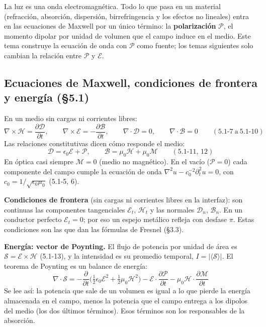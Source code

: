 \documentclass[10pt]{article}
\newcommand{\Ec}{\boldsymbol{\mathcal E}}
\newcommand{\Hc}{\boldsymbol{\mathcal H}}
\newcommand{\Dc}{\boldsymbol{\mathcal D}}
\newcommand{\Bc}{\boldsymbol{\mathcal B}}
\newcommand{\Pc}{\boldsymbol{\mathcal P}}
\newcommand{\Sc}{\boldsymbol{\mathcal S}}
\begin{document}
\begin{idea}
La luz es una onda electromagnética. Todo lo que pasa en un material (refracción, absorción, dispersión, birrefringencia y los efectos no lineales) entra en las ecuaciones de Maxwell por un único término: la \textbf{polarización} $\Pc$, el momento dipolar por unidad de volumen que el campo induce en el medio. Este tema construye la ecuación de onda con $\Pc$ como fuente; los temas siguientes solo cambian la relación entre $\Pc$ y $\Ec$.
\end{idea}

\subsection{Ecuaciones de Maxwell, condiciones de frontera y energía (§5.1)}
En un medio sin cargas ni corrientes libres:
\[
\nabla\times\Hc=\frac{\partial\Dc}{\partial t},\qquad
\nabla\times\Ec=-\frac{\partial\Bc}{\partial t},\qquad
\nabla\cdot\Dc=0,\qquad \nabla\cdot\Bc=0 \qquad(5.1\text{-}7\ \text{a}\ 5.1\text{-}10)
\]
Las relaciones constitutivas dicen cómo responde el medio:
\[
\Dc=\epsilon_0\Ec+\Pc,\qquad \Bc=\mu_0\Hc+\mu_0\boldsymbol{\mathcal M}\qquad(5.1\text{-}11,\,12)
\]
En óptica casi siempre $\boldsymbol{\mathcal M}=0$ (medio no magnético). En el vacío ($\Pc=0$) cada componente del campo cumple la ecuación de onda $\nabla^2u-c_0^{-2}\partial_t^2u=0$, con $c_0=1/\sqrt{\epsilon_0\mu_0}$ (5.1-5, 6).

\textbf{Condiciones de frontera} (sin cargas ni corrientes libres en la interfaz): son continuas las componentes tangenciales $\mathcal E_t$, $\mathcal H_t$ y las normales $\mathcal D_n$, $\mathcal B_n$. En un conductor perfecto $\mathcal E_t=0$; por eso un espejo metálico refleja con desfase $\pi$. Estas condiciones son las que dan las fórmulas de Fresnel (§3.3).

\textbf{Energía: vector de Poynting.} El flujo de potencia por unidad de área es $\Sc=\Ec\times\Hc$ (5.1-13), y la intensidad es su promedio temporal, $I=|\langle\Sc\rangle|$. El teorema de Poynting es un balance de energía:
\[
\nabla\cdot\Sc=-\frac{\partial}{\partial t}\Big(\tfrac12\epsilon_0\mathcal E^2+\tfrac12\mu_0\mathcal H^2\Big)-\Ec\cdot\frac{\partial\Pc}{\partial t}-\mu_0\Hc\cdot\frac{\partial\boldsymbol{\mathcal M}}{\partial t}
\]
Se lee así: la potencia que sale de un volumen es igual a lo que pierde la energía almacenada en el campo, menos la potencia que el campo entrega a los dipolos del medio (los dos últimos términos). Esos términos son los responsables de la absorción.
\end{document}
